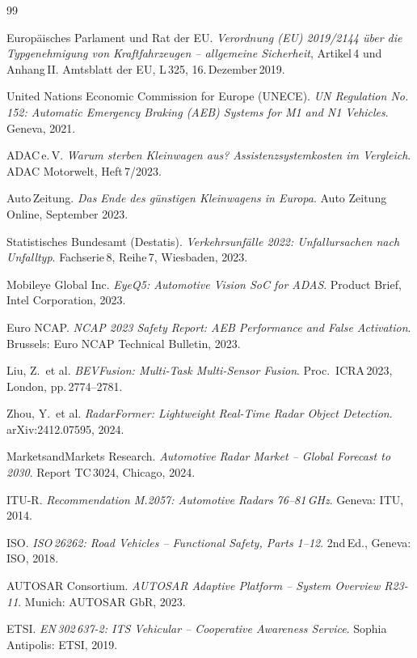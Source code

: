 \documentclass[a4paper,12pt]{article}
\theoremstyle{definition}
\begin{document}
\begin{thebibliography}{99}

Europ\"aisches Parlament und Rat der EU.
\textit{Verordnung (EU) 2019/2144 \"uber die Typgenehmigung von
Kraftfahrzeugen -- allgemeine Sicherheit}, Artikel\,4 und Anhang\,II.
Amtsblatt der EU, L\,325, 16.\,Dezember\,2019.

United Nations Economic Commission for Europe (UNECE).
\textit{UN Regulation No.\,152: Automatic Emergency Braking (AEB)
Systems for M1 and N1 Vehicles}. Geneva, 2021.

ADAC\,e.\,V.
\textit{Warum sterben Kleinwagen aus? Assistenzsystemkosten im Vergleich}.
ADAC Motorwelt, Heft\,7/2023.

Auto\,Zeitung.
\textit{Das Ende des g\"unstigen Kleinwagens in Europa}.
Auto Zeitung Online, September 2023.

Statistisches Bundesamt (Destatis).
\textit{Verkehrsunf\"alle 2022: Unfallursachen nach Unfalltyp}.
Fachserie\,8, Reihe\,7, Wiesbaden, 2023.

Mobileye Global Inc.
\textit{EyeQ5: Automotive Vision SoC for ADAS}.
Product Brief, Intel Corporation, 2023.

Euro NCAP.
\textit{NCAP 2023 Safety Report: AEB Performance and False Activation}.
Brussels: Euro NCAP Technical Bulletin, 2023.

Liu, Z.\ et al.
\textit{BEVFusion: Multi-Task Multi-Sensor Fusion}.
Proc.\ ICRA\,2023, London, pp.\,2774--2781.

Zhou, Y.\ et al.
\textit{RadarFormer: Lightweight Real-Time Radar Object Detection}.
arXiv:2412.07595, 2024.

MarketsandMarkets Research.
\textit{Automotive Radar Market -- Global Forecast to 2030}.
Report TC\,3024, Chicago, 2024.

ITU-R.
\textit{Recommendation M.2057: Automotive Radars 76--81\,GHz}.
Geneva: ITU, 2014.

ISO.
\textit{ISO\,26262: Road Vehicles -- Functional Safety, Parts 1--12}.
2nd\,Ed., Geneva: ISO, 2018.

AUTOSAR Consortium.
\textit{AUTOSAR Adaptive Platform -- System Overview R23-11}.
Munich: AUTOSAR GbR, 2023.

ETSI.
\textit{EN\,302\,637-2: ITS Vehicular -- Cooperative Awareness Service}.
Sophia Antipolis: ETSI, 2019.

\end{thebibliography}
\end{document}
